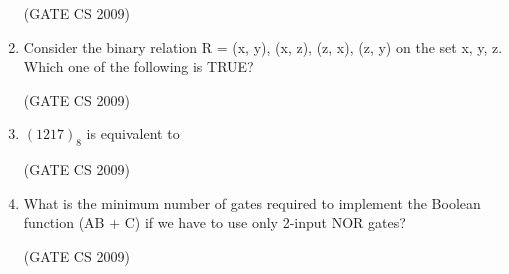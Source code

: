 \documentclass[a4paper, 11pt]{article}
\begin{document}
\begin{enumerate}
    \hfill (GATE CS 2009)

    \item Consider the binary relation R = {(x, y), (x, z), (z, x), (z, y)} on the set {x, y, z}. Which one of the following is TRUE?\\
    \begin{enumerate}
    \end{enumerate}

    \hfill (GATE CS 2009)

    \item $(1217)_8$ is equivalent to\\
    \begin{enumerate}
    \end{enumerate}

    \hfill (GATE CS 2009)

    \item What is the minimum number of gates required to implement the Boolean function (AB + C) if we have to use only 2-input NOR gates?\\
    \begin{enumerate}
    \end{enumerate}

    \hfill (GATE CS 2009)


\end{enumerate}
\end{document}
